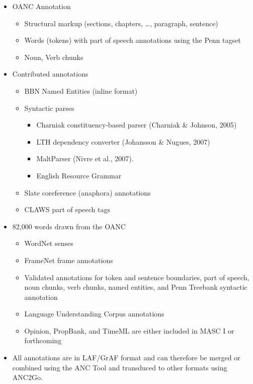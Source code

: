 \documentclass[a4paper,landscape,headrule,footrule,xetex]{foils}
\begin{document}
\begin{itemize}\addtolength{\itemsep}{-1ex}
\item OANC Annotation
  \begin{itemize}
  \item  Structural markup (sections, chapters, \ldots, paragraph, sentence)
  \item  Words (tokens) with part of speech annotations using the Penn tagset
  \item  Noun, Verb chunks
\end{itemize}
\item Contributed annotations
  \begin{itemize}
  \item BBN Named Entities (inline format)
  \item Syntactic parses
    \begin{itemize}
    \item Charniak constituency-based parser (Charniak \& Johnson, 2005)
    \item LTH dependency converter (Johansson \& Nugues, 2007)
    \item MaltParser (Nivre et al., 2007).
    \item English Resource Grammar \citep{Flickinger:2008}
    \end{itemize}
  \item Slate coreference (anaphora) annotations
  \item CLAWS part of speech tags
  \end{itemize}
\end{itemize}


\begin{itemize}
\item 82,000 words drawn from the OANC
  \begin{itemize}
  \item WordNet senses
  \item FrameNet frame annotations
  \item Validated annotations for token and sentence boundaries, part of speech, noun chunks, verb chunks, named entities, and Penn Treebank syntactic annotation
  \item Language Understanding Corpus annotations
  \item Opinion, PropBank, and TimeML are either included in MASC I or forthcoming
  \end{itemize}
\item  All annotations are in LAF/GrAF format and can therefore be merged or combined using the ANC Tool and transduced to other formats using ANC2Go. 
\end{itemize}
  
\end{document}
